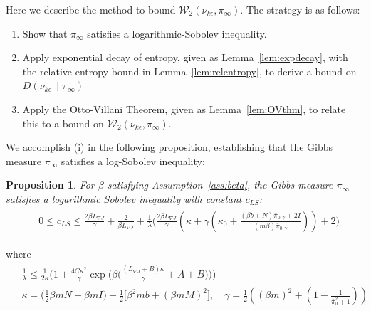 \documentclass[journal,onecolumn]{IEEEtran}
\newtheorem{proposition}{Proposition}
\newcommand{\step}{\epsilon}
\newcommand{\grad}{\nabla}
\newcommand{\rew}{J}
\newcommand{\reals}{\mathbb{R}}
\newcommand{\dimn}{N}
\newcommand{\kn}{\kappa_0}
\newcommand{\wass}{\mathcal{W}_2}
\newcommand{\KL}{D}
\newcommand{\gibbs}{\ids_{\infty}}
\newcommand{\ctlaw}{\nu_{k\step}}
\newcommand{\pconst}{c_P}
\newcommand{\LSconst}{c_{LS}}
\newcommand{\ids}{\pi}
\newcommand{\idistmax}{\bar{\ids}_0}
\newcommand{\idw}{\gamma}
\newcommand{\isp}{0,\idw}
\newcommand{\idistmaxw}{\bar{\ids}_{\isp}}
\newcommand{\specgap}{\lambda}
\newcommand{\tailbound}{M}
\newcommand{\constA}{A}
\newcommand{\constB}{B}
\newcommand{\idiffc}{I}
\newcommand{\dissm}{m}
\newcommand{\dissb}{b}
\newcommand{\lipGJ}{L_{\grad\rew}}
\begin{document}
{Here we describe the method to bound $\wass(\ctlaw,\gibbs)$. The strategy is as follows:
\begin{enumerate}[label=\roman*)]
    \item Show that $\gibbs$ satisfies a logarithmic-Sobolev inequality.
    \item Apply exponential decay of entropy, given as Lemma~\ref{lem:expdecay}, with the relative entropy bound in Lemma~\ref{lem:relentropy}, to derive a bound on $\KL(\ctlaw\|\gibbs)$
    \item Apply the Otto-Villani Theorem, given as Lemma~\ref{lem:OVthm}, to relate this to a bound on $\wass(\ctlaw,\gibbs)$.
\end{enumerate}
We accomplish (i) in the following proposition, establishing that the Gibbs measure $\gibbs$ satisfies a log-Sobolev inequality:
\begin{proposition}
\label{prop:logsob}
For $\beta$ satisfying Assumption~\ref{ass:beta}, the Gibbs measure $\gibbs$ satisfies a logarithmic Sobolev inequality with constant $\LSconst$:
\begin{align}
    \begin{split}
    \label{eq:lsconst}
        &0 \leq \LSconst \leq \frac{2\beta \lipGJ}{\gamma} + \frac{2}{\beta \lipGJ}  + \frac{1}{\specgap} \biggl(\frac{2\beta \lipGJ}{\gamma}\left( \kappa + \gamma\left(\kn + \frac{(\beta \dissb + \dimn)\idistmaxw + 2\idiffc}{(\dissm\beta)\idistmaxw}\right)\right) + 2\biggr)
    \end{split}
\end{align}

\end{proposition}
where 
\begin{align}
    \begin{split}
    \label{eq:kg}
        &\frac{1}{\specgap} \leq \frac{1}{2\kappa} \biggl(1 + \frac{4C\kappa^2}{\gamma}\exp\biggl(\beta\biggl(\frac{(\lipGJ+\constB)\kappa}{\gamma} + \constA + \constB\biggr)\biggr) \biggr)\\
         &\kappa = \biggl(\frac{1}{2} \beta\dissm \dimn  + \beta \dissm \idiffc \biggr) + \frac{1}{2}\biggl[ \beta^2\dissm \dissb  + \left(\beta\dissm\tailbound\right)^2 \biggr], \quad \gamma = \frac{1}{2}\left((\beta\dissm)^2 + \left( 1-\frac{1}{\idistmax^2+1}\right)\right) 

\end{split}
\end{align}}
\end{document}
